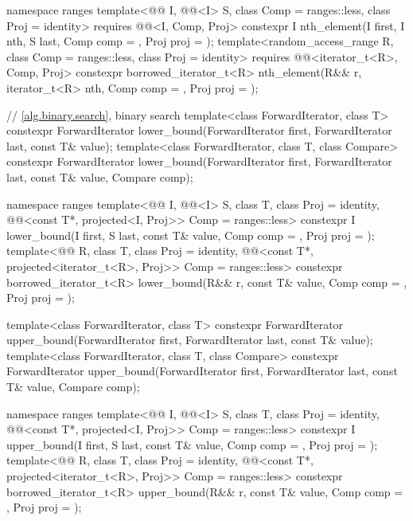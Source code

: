 \begin{codeblock}
{  namespace ranges {
    template<@@ I, @@<I> S, class Comp = ranges::less,
             class Proj = identity>
      requires @@<I, Comp, Proj>
      constexpr I
        nth_element(I first, I nth, S last, Comp comp = {}, Proj proj = {});
    template<random_access_range R, class Comp = ranges::less, class Proj = identity>
      requires @@<iterator_t<R>, Comp, Proj>
      constexpr borrowed_iterator_t<R>
        nth_element(R&& r, iterator_t<R> nth, Comp comp = {}, Proj proj = {});
  }

  // \ref{alg.binary.search}, binary search
  template<class ForwardIterator, class T>
    constexpr ForwardIterator
      lower_bound(ForwardIterator first, ForwardIterator last,
                  const T& value);
  template<class ForwardIterator, class T, class Compare>
    constexpr ForwardIterator
      lower_bound(ForwardIterator first, ForwardIterator last,
                  const T& value, Compare comp);

  namespace ranges {
    template<@@ I, @@<I> S, class T, class Proj = identity,
             @@<const T*, projected<I, Proj>> Comp = ranges::less>
      constexpr I lower_bound(I first, S last, const T& value, Comp comp = {},
                              Proj proj = {});
    template<@@ R, class T, class Proj = identity,
             @@<const T*, projected<iterator_t<R>, Proj>> Comp =
               ranges::less>
      constexpr borrowed_iterator_t<R>
        lower_bound(R&& r, const T& value, Comp comp = {}, Proj proj = {});
  }

  template<class ForwardIterator, class T>
    constexpr ForwardIterator
      upper_bound(ForwardIterator first, ForwardIterator last,
                  const T& value);
  template<class ForwardIterator, class T, class Compare>
    constexpr ForwardIterator
      upper_bound(ForwardIterator first, ForwardIterator last,
                  const T& value, Compare comp);

  namespace ranges {
    template<@@ I, @@<I> S, class T, class Proj = identity,
             @@<const T*, projected<I, Proj>> Comp = ranges::less>
      constexpr I upper_bound(I first, S last, const T& value, Comp comp = {}, Proj proj = {});
    template<@@ R, class T, class Proj = identity,
             @@<const T*, projected<iterator_t<R>, Proj>> Comp =
               ranges::less>
      constexpr borrowed_iterator_t<R>
        upper_bound(R&& r, const T& value, Comp comp = {}, Proj proj = {});
  }

}
\end{codeblock}
